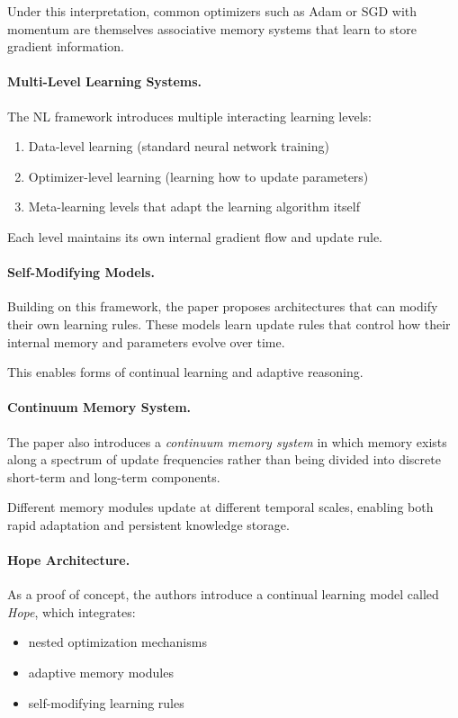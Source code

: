 \documentclass[12pt]{article}
\begin{document}
Under this interpretation, common optimizers such as Adam or SGD with momentum
are themselves associative memory systems that learn to store gradient information.

\paragraph{Multi-Level Learning Systems.}
The NL framework introduces multiple interacting learning levels:

\begin{enumerate}
		\item Data-level learning (standard neural network training)
		\item Optimizer-level learning (learning how to update parameters)
		\item Meta-learning levels that adapt the learning algorithm itself
\end{enumerate}

Each level maintains its own internal gradient flow and update rule.

\paragraph{Self-Modifying Models.}
Building on this framework, the paper proposes architectures that can modify
their own learning rules. These models learn update rules that control how
their internal memory and parameters evolve over time.

This enables forms of continual learning and adaptive reasoning.

\paragraph{Continuum Memory System.}
The paper also introduces a \emph{continuum memory system} in which memory
exists along a spectrum of update frequencies rather than being divided into
discrete short-term and long-term components.

Different memory modules update at different temporal scales, enabling
both rapid adaptation and persistent knowledge storage.

\paragraph{Hope Architecture.}
As a proof of concept, the authors introduce a continual learning model
called \emph{Hope}, which integrates:

\begin{itemize}
		\item nested optimization mechanisms
		\item adaptive memory modules
		\item self-modifying learning rules
\end{itemize}
\end{document}
